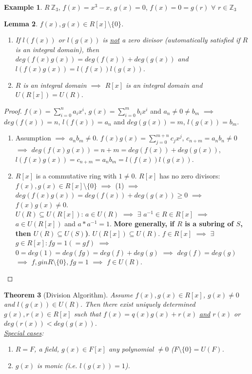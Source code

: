 \documentclass[11pt]{article}
\newtheorem{thm}{Theorem}[section]
\newtheorem{lem}[thm]{Lemma}
\theoremstyle{definition}
\newtheorem{example}[thm]{Example}
\numberwithin{equation}{section}
\newcommand{\Z}{\mathbb{Z}}
\begin{document}
\begin{example}
$R \ \Z_{3}$, $f(x) = x^{3} - x$, $g(x) = 0$, $f(x) = 0 = g(r)$ $\forall$ $r \in \Z_{3}$
\end{example}

\begin{lem}
$f(x), g(x) \in R[x] \setminus \{0\}$.
\begin{enumerate}
    \item If $l(f(x))$ or $l(g(x))$ is \underline{not} a zero divisor (automatically satisfied if $R$ is an integral domain), then $deg(f(x)g(x)) = deg(f(x)) + deg(g(x))$ and $l(f(x)g(x)) = l(f(x))l(g(x))$.
    \item $R$ is an integral domain $\implies$ $R[x]$ is an integral domain and $U(R[x]) = U(R)$.
\end{enumerate}
\end{lem}

\begin{proof}
$f(x) = \sum_{i=0}^{n}a_{i}x^{i}$, $g(x) = \sum_{i=0}^{m} b_{i}x^{i}$ and $a_{n} \neq 0 \neq b_{m}$ $\implies$ $deg(f(x)) = n$, $l(f(x)) = a_{n}$ and $deg(g(x)) = m$, $l(g(x)) = b_{m}$.
\begin{enumerate}
    \item Assumption $\implies$ $a_{n}b_{m} \neq 0$. $f(x)g(x) = \sum_{j=0}^{m+n}c_{j}x^{j}$, $c_{n+m} = a_{n}b_{n} \neq 0$ $\implies$ $deg(f(x)g(x)) = n+m = deg(f(x)) + deg(g(x))$, $l(f(x)g(x)) = c_{n+m} = a_{n}b_{m} = l(f(x))l(g(x))$.
    \item $R[x]$ is a commutative ring with $ 1 \neq 0$. $R[x]$ has no zero divisors: $f(x), g(x) \in R[x] \setminus \{0\}$ $\implies$ (1) $\implies$ $deg(f(x)g(x)) = deg(f(x)) + deg(g(x)) \geq 0$ $\implies$ $f(x)g(x) \neq 0$.\\
    $U(R) \subseteq U(R[x])$: $a \in U(R) $ $\implies$ $\exists$ $a^{-1} \in R \in R[x]$ $\implies$ $a \in U(R[x])$ and $a*a^{-1} = 1$. \textbf{More generally, if $R$ is a subring of $S$, then $U(R) \subseteq U(S)$)}. $U(R[x]) \subseteq U(R)$. $f \in R[x]$ $\implies$ $\exists$ $g \in R[x]: fg = 1 (= gf)$ $\implies$ $0 = deg(1) = deg(fg) = deg(f) + deg(g)$ $\implies$ $deg(f) = deg(g)$ $\implies$ $f, g
    in R \setminus \{0\}, fg = 1$ $\implies$ $f \in U(R)$.
\end{enumerate}
\end{proof}

\begin{thm}[Division Algorithm]
Assume $f(x), g(x) \in R[x]$, $g(x) \neq 0$ and $l(g(x)) \in U(R)$. Then there exist uniquely determined $g(x), r(x) \in R[x]$ such that $f(x) = q(x)g(x) + r(x)$ \underline{and} $r(x)$ or $deg(r(x)) < deg(g(x))$. \\
\underline{Special cases}:
\begin{enumerate}
    \item $R = F$, a field, $g(x) \in F[x]$ any polynomial $\neq 0$ ($F \setminus \{0\} = U(F)$.
    \item $g(x)$ is monic (i.e. $l(g(x)) = 1$).
\end{enumerate}
\end{thm}
\end{document}
